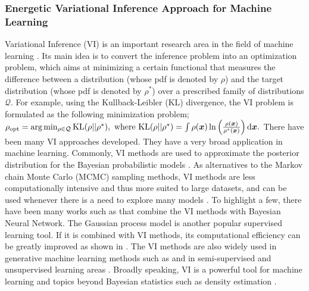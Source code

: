 \subsubsection{Energetic Variational Inference Approach for Machine Learning}
Variational Inference (VI) is an important research area in the field of machine learning \cite{jordan1999introduction, blei2017variational}.
Its main idea is to convert the inference problem into an optimization problem, which aims at minimizing a certain functional that measures the difference between a distribution (whose pdf is denoted by $\rho$) and the target distribution (whose pdf is denoted by $\rho^*$) over a prescribed family of distributions $\mathcal{Q}$.
For example, using the Kullback-Leibler (KL) divergence, the VI problem is formulated as the following minimization problem;
$
\rho_{\text{opt}} =\text{arg}\min_{\rho \in \mathcal{Q} }\mathrm{KL}(\rho||\rho^*), \text{ where } \mathrm{KL}( \rho ||\rho^*)  = \int \rho(\bm{x}) \ln \left( \frac{\rho(\bm{x})}{\rho^*(\bm{x} )} \right) \mathrm{d} \bm{x}.
$
There have been many VI approaches developed. 
They have a very broad application in machine learning.
Commonly, VI methods are used to approximate the posterior distribution for the Bayesian probabilistic models \cite{jordan1999introduction, neal1998view,  wainwright2008graphical, zhang2018advances}.
As alternatives to the Markov chain Monte Carlo (MCMC) sampling methods, VI methods are less computationally intensive and thus more suited to large datasets, and can be used whenever there is a need to explore many models \cite{blei2017variational}.
To highlight a few, there have been many works such as \cite{grave2011practical,welling2017multiplicative, wu2019deterministic,shridhar2019comprehensive} that combine the VI methods with Bayesian Neural Network.
The Gaussian process model is another popular supervised learning tool.
If it is combined with VI methods, its computational efficiency can be greatly improved as shown in \cite{king2006fast, nguyen2013efficient, nguyen2014automated, shetha2015sparse, damianou2016variational, cheng2017variational}.
The VI methods are also widely used in generative machine learning methods such as \cite{kingma2013auto, rezende2014stochastic, goodfellow2014generative,nowozin2016f, hu2017unifying} and in semi-supervised and unsupervised learning areas \cite{kingma2014semi,mnih2016variational,hu2017unifying}.
Broadly speaking, VI is a powerful tool for machine learning \cite{ma2019machine} and topics beyond Bayesian statistics such as density estimation \cite{tabak2010density}.

